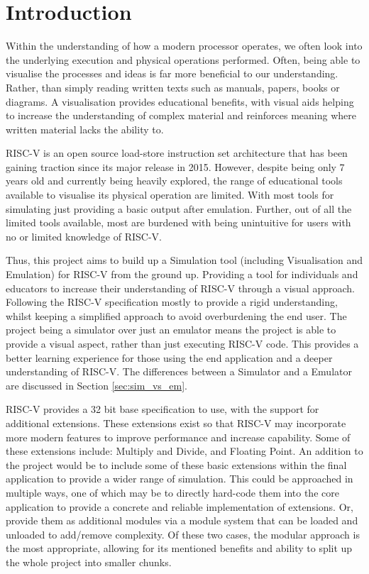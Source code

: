 \chapter{Introduction}
\label{ch:introduction}
Within the understanding of how a modern processor operates, we often look into the underlying execution and physical operations performed. Often, being able to visualise the processes and ideas is far more beneficial \cite{quratulain_2019_a} to our understanding. Rather, than simply reading written texts such as manuals, papers, books or diagrams. A visualisation provides educational benefits, with visual aids helping to increase the understanding of complex material and reinforces meaning where written material lacks the ability to.

RISC-V \cite{waterman_2019_the} is an open source load-store instruction set architecture that has been gaining traction since its major release in 2015. However, despite being only 7 years old and currently being heavily explored, the range of educational tools available to visualise its physical operation are limited. With most tools for simulating just providing a basic output after emulation. Further, out of all the limited tools available, most are burdened with being unintuitive for users with no or limited knowledge of RISC-V.

Thus, this project aims to build up a Simulation tool (including Visualisation and Emulation) for RISC-V from the ground up. Providing a tool for individuals and educators to increase their understanding of RISC-V through a visual approach. Following the RISC-V specification \cite{waterman_2011_the} mostly to provide a rigid understanding, whilst keeping a simplified approach to avoid overburdening the end user. The project being a simulator over just an emulator means the project is able to provide a visual aspect, rather than just executing RISC-V code. This provides a better learning experience for those using the end application and a deeper understanding of RISC-V. The differences between a Simulator and a Emulator are discussed in Section \ref{sec:sim_vs_em}.

RISC-V provides a 32 bit base specification to use, with the support for additional extensions. These extensions exist so that RISC-V may incorporate more modern features to improve performance and increase capability. Some of these extensions include: Multiply and Divide, and Floating Point. An addition to the project would be to include some of these basic extensions within the final application to provide a wider range of simulation. This could be approached in multiple ways, one of which may be to directly hard-code them into the core application to provide a concrete and reliable implementation of extensions. Or, provide them as additional modules via a module system that can be loaded and unloaded to add/remove complexity. Of these two cases, the modular approach is the most appropriate, allowing for its mentioned benefits and ability to split up the whole project into smaller chunks.

